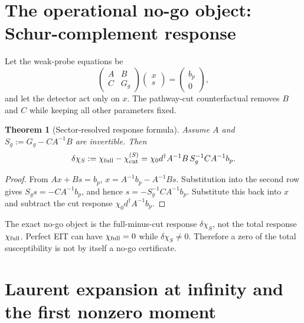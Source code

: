 \documentclass[11pt,a4paper]{article}
\newtheorem{theorem}{Theorem}[section]
\theoremstyle{remark}
\newcommand{\dchi}{\delta\chi_S}
\begin{document}
\section{The operational no-go object: Schur-complement response}

Let the weak-probe equations be
\[
\begin{pmatrix}A&B\\C&G_g\end{pmatrix}
\begin{pmatrix}x\\s\end{pmatrix}
=\begin{pmatrix}b_p\\0\end{pmatrix},
\]
and let the detector act only on $x$.  The pathway-cut counterfactual removes
$B$ and $C$ while keeping all other parameters fixed.

\begin{theorem}[Sector-resolved response formula]
Assume $A$ and $S_g:=G_g-CA^{-1}B$ are invertible.  Then
\begin{equation}
\dchi:=\chi_{\rm full}-\chi_{\rm cut}^{(S)}
=\chi_0 d^\dagger A^{-1}B\,S_g^{-1}C A^{-1}b_p.
\label{eq:schur-response}
\end{equation}
\end{theorem}

\begin{proof}
From $Ax+Bs=b_p$,
$x=A^{-1}b_p-A^{-1}Bs$.  Substitution into the second row gives
$S_gs=-CA^{-1}b_p$, and hence
$s=-S_g^{-1}CA^{-1}b_p$.  Substitute this back into $x$ and subtract the
cut response $\chi_0d^\dagger A^{-1}b_p$.
\end{proof}

\begin{claimbox}
The exact no-go object is the full-minus-cut response $\dchi$, not the total
response $\chi_{\rm full}$.  Perfect EIT can have $\chi_{\rm full}=0$ while
$\dchi\ne0$.  Therefore a zero of the total susceptibility is not by itself a
no-go certificate.
\end{claimbox}

\section{Laurent expansion at infinity and the first nonzero moment}
\end{document}
